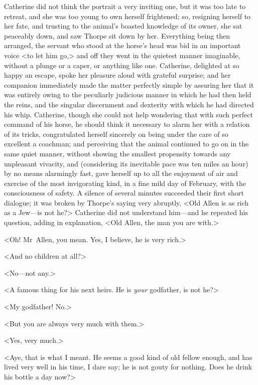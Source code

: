  Catherine did not think the portrait a very inviting one, but it was too late to retreat, and she was too young to own herself frightened; so, resigning herself to her fate, and trusting to the animal's boasted knowledge of its owner, she sat peaceably down, and saw Thorpe sit down by her. Everything being then arranged, the servant who stood at the horse's head was bid in an important voice <to let him go,> and off they went in the quietest manner imaginable, without a plunge or a caper, or anything like one. Catherine, delighted at so happy an escape, spoke her pleasure aloud with grateful surprise; and her companion immediately made the matter perfectly simple by assuring her that it was entirely owing to the peculiarly judicious manner in which he had then held the reins, and the singular discernment and dexterity with which he had directed his whip. Catherine, though she could not help wondering that with such perfect command of his horse, he should think it necessary to alarm her with a relation of its tricks, congratulated herself sincerely on being under the care of so excellent a coachman; and perceiving that the animal continued to go on in the same quiet manner, without showing the smallest propensity towards any unpleasant vivacity, and (considering its inevitable pace was ten miles an hour) by no means alarmingly fast, gave herself up to all the enjoyment of air and exercise of the most invigorating kind, in a fine mild day of February, with the consciousness of safety. A silence of several minutes succeeded their first short dialogue; it was broken by Thorpe's saying very abruptly, <Old Allen is as rich as a Jew—is not he?> Catherine did not understand him—and he repeated his question, adding in explanation, <Old Allen, the man you are with.> 

 <Oh! Mr~Allen, you mean. Yes, I believe, he is very rich.> 

 <And no children at all?> 

 <No—not any.> 

 <A famous thing for his next heirs. He is \textit{your} godfather, is not he?> 

 <My godfather! No.> 

 <But you are always very much with them.> 

 <Yes, very much.> 

 <Aye, that is what I meant. He seems a good kind of old fellow enough, and has lived very well in his time, I dare say; he is not gouty for nothing. Does he drink his bottle a day now?> 

